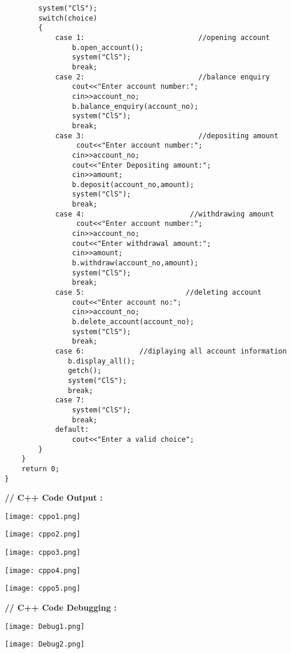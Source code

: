 \documentclass[11pt, a4paper]{article}
\begin{document}
\begin{lstlisting}
        system("ClS");
        switch(choice)
        {
            case 1:                           //opening account
                b.open_account();
                system("ClS");
                break;
            case 2:                           //balance enquiry  
                cout<<"Enter account number:";
                cin>>account_no;
                b.balance_enquiry(account_no);
                system("ClS");
                break;
            case 3:                           //depositing amount 
                 cout<<"Enter account number:";
                cin>>account_no;
                cout<<"Enter Depositing amount:";
                cin>>amount;
                b.deposit(account_no,amount);
                system("ClS");
                break;
            case 4:                         //withdrawing amount 
                 cout<<"Enter account number:";
                cin>>account_no;
                cout<<"Enter withdrawal amount:";
                cin>>amount;
                b.withdraw(account_no,amount);
                system("ClS");
                break;
            case 5:                        //deleting account 
                cout<<"Enter account no:";
                cin>>account_no;
                b.delete_account(account_no);
                system("ClS");
                break;
            case 6:             //diplaying all account information
               b.display_all();
               getch();
               system("ClS");
               break;
            case 7:
                system("ClS");
                break;
            default:
                cout<<"Enter a valid choice";
        }
    }
    return 0;
}
\end{lstlisting}
\newpage
\textbf{// C++ Code Output :}
\vspace{0.8cm}
\begin{center}
    \texttt{[image: cppo1.png]}
\end{center}
\begin{center}
    \texttt{[image: cppo2.png]}
\end{center}
\begin{center}
    \texttt{[image: cppo3.png]}
\end{center}
\begin{center}
    \texttt{[image: cppo4.png]}
\end{center}
\begin{center}
    \texttt{[image: cppo5.png]}
\end{center}
\newpage
\textbf{// C++ Code Debugging :}
\vspace{0.8cm}
\begin{center}
    \texttt{[image: Debug1.png]}
\end{center}
\texttt{[image: Debug2.png]}
\end{document}
